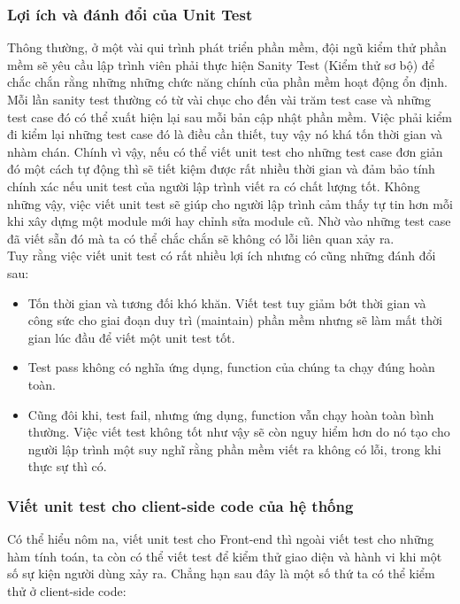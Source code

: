 			 	\subsubsection{Lợi ích và đánh đổi của Unit Test}
			 	Thông thường, ở một vài qui trình phát triển phần mềm, đội ngũ kiểm thử phần mềm sẽ yêu cầu lập trình viên phải thực hiện Sanity Test (Kiểm thử sơ bộ) để chắc chắn rằng những những chức năng chính của phần mềm hoạt động ổn định. Mỗi lần sanity test thường có từ vài chục cho đến vài trăm test case và những test case đó có thể xuất hiện lại sau mỗi bản cập nhật phần mềm. Việc phải kiểm đi kiểm lại những test case đó là điều cần thiết, tuy vậy nó khá tốn thời gian và nhàm chán. Chính vì vậy, nếu có thể viết unit test cho những test case đơn giản đó một cách tự động thì sẽ tiết kiệm được rất nhiều thời gian và đảm bảo tính chính xác nếu unit test của người lập trình viết ra có chất lượng tốt. Không những vậy, việc viết unit test sẽ giúp cho người lập trình cảm thấy tự tin hơn mỗi khi xây dựng một module mới hay chỉnh sửa module cũ. Nhờ vào những test case đã viết sẵn đó mà ta có thể chắc chắn sẽ không có lỗi liên quan xảy ra.\\
			 	
			 	Tuy rằng việc viết unit test có rất nhiều lợi ích nhưng có cũng những đánh đổi sau:
			 	\begin{itemize}
			 		\item Tốn thời gian và tương đối khó khăn. Viết test tuy giảm bớt thời gian và công sức cho giai đoạn duy trì (maintain) phần mềm nhưng sẽ làm mất thời gian lúc đầu để viết một unit test tốt.
			 		\item Test pass không có nghĩa ứng dụng, function của chúng ta chạy đúng hoàn toàn.
			 		\item Cũng đôi khi, test fail, nhưng ứng dụng, function vẫn chạy hoàn toàn bình thường. Việc viết test không tốt như vậy sẽ còn nguy hiểm hơn do nó tạo cho người lập trình một suy nghĩ rằng phần mềm viết ra không có lỗi, trong khi thực sự thì có.
			 	\end{itemize}
			 	
			 	\subsubsection{Viết unit test cho client-side code của hệ thống}
			 	Có thể hiểu nôm na, viết unit test cho Front-end thì ngoài viết test cho những hàm tính toán, ta còn có thể viết test để kiểm thử giao diện và hành vi khi một số sự kiện người dùng xảy ra. Chẳng hạn sau đây là một số thứ ta có thể kiểm thử ở client-side code:
			 	
